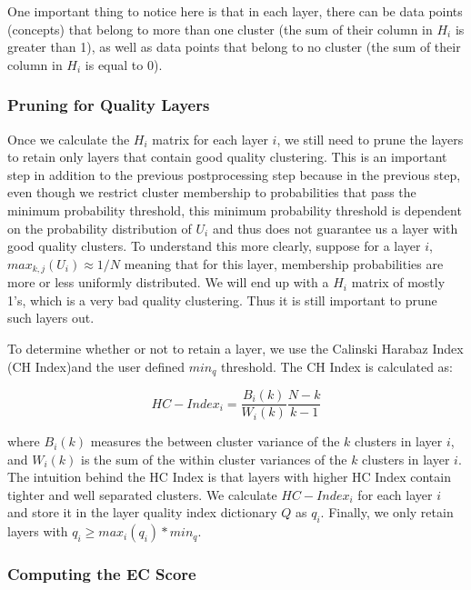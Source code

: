 One important thing to notice here is that in each layer, there can be data points (concepts) that belong to more than one cluster (the sum of their column in $H_{i}$ is greater than 1), as well as data points that belong to no cluster (the sum of their column in $H_{i}$ is equal to 0).

\subsubsection{Pruning for Quality Layers}\label{pruning_layers}
Once we calculate the $H_{i}$ matrix for each layer $i$, we still need to prune the layers to retain only layers that contain good quality clustering. This is an important step in addition to the previous postprocessing step because in the previous step, even though we restrict cluster membership to probabilities that pass the minimum probability threshold, this minimum probability threshold is dependent on the probability distribution of $U_{i}$ and thus does not guarantee us a layer with good quality clusters. To understand this more clearly, suppose for a layer $i$, $max_{k,j}(U_{i}) \approx 1/N$ meaning that for this layer, membership probabilities are more or less uniformly distributed. We will end up with a $H_{i}$ matrix of mostly 1's, which is a very bad quality clustering. Thus it is still important to prune such layers out.

To determine whether or not to retain a layer, we use the Calinski Harabaz Index (CH Index)and the user defined $min_q$ threshold. The CH Index is calculated as:

\begin{equation}
HC-Index_{i} = \frac{B_{i}(k)}{W_{i}(k)}\frac{N-k}{k-1}
\end{equation}

where $B_{i}(k)$ measures the between cluster variance of the $k$ clusters in layer $i$, and $W_{i}(k)$ is the sum of the within cluster variances of the $k$ clusters in layer $i$. The intuition behind the HC Index is that layers with higher HC Index contain tighter and well separated clusters.
We calculate $HC-Index_{i}$ for each layer $i$ and store it in the layer quality index dictionary $Q$ as $q_{i}$. Finally, we only retain layers with $q_{i} \geq max_{i}(q_{i}) * min_q$.

\subsubsection{Computing the EC Score}\label{calc_ec}

